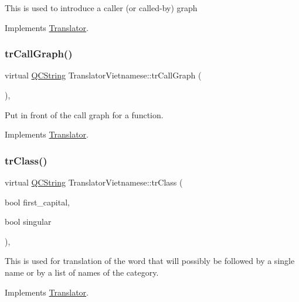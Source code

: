 This is used to introduce a caller (or called-\/by) graph 

Implements \mbox{\hyperlink{class_translator}{Translator}}.

\mbox{\label{class_translator_vietnamese_a57072a7154758c0d2f21b2a24ad6d65e}} 
\subsubsection{\texorpdfstring{trCallGraph()}{trCallGraph()}}
{\footnotesize\ttfamily virtual \mbox{\hyperlink{class_q_c_string}{Q\+C\+String}} Translator\+Vietnamese\+::tr\+Call\+Graph (\begin{DoxyParamCaption}{ }\end{DoxyParamCaption})\hspace{0.3cm}{\ttfamily [inline]}, {\ttfamily [virtual]}}

Put in front of the call graph for a function. 

Implements \mbox{\hyperlink{class_translator}{Translator}}.

\mbox{\label{class_translator_vietnamese_a007ef564d762b681b74db2eb01b661d1}} 
\subsubsection{\texorpdfstring{trClass()}{trClass()}}
{\footnotesize\ttfamily virtual \mbox{\hyperlink{class_q_c_string}{Q\+C\+String}} Translator\+Vietnamese\+::tr\+Class (\begin{DoxyParamCaption}\item[{bool}]{first\+\_\+capital,  }\item[{bool}]{singular }\end{DoxyParamCaption})\hspace{0.3cm}{\ttfamily [inline]}, {\ttfamily [virtual]}}

This is used for translation of the word that will possibly be followed by a single name or by a list of names of the category. 

Implements \mbox{\hyperlink{class_translator}{Translator}}.

